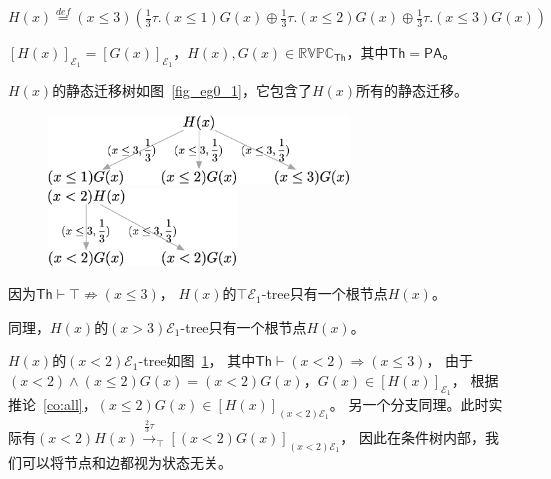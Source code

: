 \begin{example}
   $H(x)\stackrel{def}{=}(x\leq 3)(\frac{1}{3}\tau.(x\leq 1)G(x)\oplus\frac{1}{3}\tau.(x\leq 2)G(x)\oplus\frac{1}{3}\tau.(x\leq 3)G(x))$

   $[H(x)]_{\mathcal{E}_1} = [G(x)]_{\mathcal{E}_1}$，$H(x),G(x)\in \mathbb{RVPC}_{\mathsf{Th}}$，其中$\mathsf{Th}=\mathsf{PA}$\cite{PA}。

   $H(x)$的静态迁移树如图~\ref{fig_eg0_1}，它包含了$H(x)$所有的静态迁移。
   \begin{figure}[!htp]
      \begin{minipage}{0.6\textwidth}
         \centering
         \includegraphics[width=8cm]{../figures/example0_1.png}
         \caption[]{}
         \label{fig_eg0_1}
   \end{minipage}\hfill
   \begin{minipage}{0.45\textwidth}
      \centering
      \includegraphics[width=5cm]{../figures/example0_2.png}
      \caption[]{}
       \label{fig_eg0_2}
   \end{minipage}
    \end{figure}

   因为$\mathsf{Th}\vdash \top \not\Rightarrow (x\leq 3)$，
   $H(x)$的$\top\mathcal{E}_1$-tree只有一个根节点$H(x)$。

   同理，$H(x)$的$(x>3)\mathcal{E}_1$-tree只有一个根节点$H(x)$。

   $H(x)$的$(x<2)\mathcal{E}_1$-tree如图~\ref{fig_eg0_2}，
   其中$\mathsf{Th}\vdash (x<2)\Rightarrow (x\leq 3)$，
   由于$(x<2)\wedge(x\leq 2)G(x) = (x<2)G(x)$，$G(x)\in[H(x)]_{\mathcal{E}_1}$，
   根据推论~\ref{co:all}，$(x\leq 2)G(x)\in [H(x)]_{(x<2)\mathcal{E}_1}$。
   另一个分支同理。此时实际有$(x<2)H(x)\stackrel{\frac{2}{3}\tau}{\rightarrow}_{\top}[(x<2)G(x)]_{(x<2)\mathcal{E_1}}$，
   因此在条件树内部，我们可以将节点和边都视为状态无关。

\end{example}

